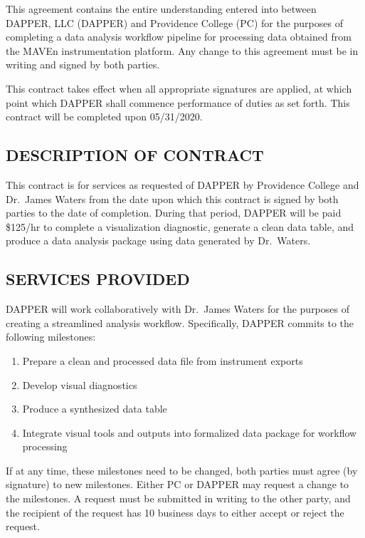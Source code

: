 \documentclass[
  11pt,
]{article}
\author{}
\date{\vspace{-2.5em}}
\providecommand{\tightlist}{%
  \setlength{\itemsep}{0pt}\setlength{\parskip}{0pt}}
\begin{document}
This agreement contains the entire understanding entered into between
DAPPER, LLC (DAPPER) and Providence College (PC) for the purposes of
completing a data analysis workflow pipeline for processing data
obtained from the MAVEn instrumentation platform. Any change to this
agreement must be in writing and signed by both parties.

This contract takes effect when all appropriate signatures are applied,
at which point which DAPPER shall commence performance of duties as set
forth. This contract will be completed upon 05/31/2020.

\hypertarget{description-of-contract}{%
\subsection{DESCRIPTION OF CONTRACT}\label{description-of-contract}}

This contract is for services as requested of DAPPER by Providence
College and Dr.~James Waters from the date upon which this contract is
signed by both parties to the date of completion. During that period,
DAPPER will be paid \$125/hr to complete a visualization diagnostic,
generate a clean data table, and produce a data analysis package using
data generated by Dr.~Waters.

\hypertarget{services-provided}{%
\subsection{SERVICES PROVIDED}\label{services-provided}}

DAPPER will work collaboratively with Dr.~James Waters for the purposes
of creating a streamlined analysis workflow. Specifically, DAPPER
commits to the following milestones:

\begin{enumerate}
\def\labelenumi{\arabic{enumi}.}
\tightlist
\item
  Prepare a clean and processed data file from instrument exports
\item
  Develop visual diagnostics
\item
  Produce a synthesized data table
\item
  Integrate visual tools and outputs into formalized data package for
  workflow processing
\end{enumerate}

If at any time, these milestones need to be changed, both parties must
agree (by signature) to new milestones. Either PC or DAPPER may request
a change to the milestones. A request must be submitted in writing to
the other party, and the recipient of the request has 10 business days
to either accept or reject the request.
\end{document}
